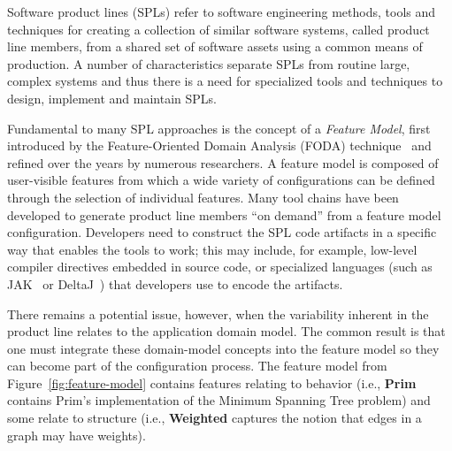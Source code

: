 
Software product lines (SPLs) refer to software engineering methods,
tools and techniques for creating a collection of similar software
systems, called product line members, from a shared set of software
assets using a common means of production. A number of characteristics
separate SPLs from routine large, complex systems and thus there is a need for specialized tools and techniques to design, implement and maintain SPLs. 

Fundamental to many SPL approaches is the concept of a \textit{Feature
Model}, first introduced by the Feature-Oriented Domain Analysis (FODA)
technique~\cite{Kang1990} and refined over the years by numerous
researchers. A feature model is composed of user-visible features from
which a wide variety of configurations can be defined through the
selection of individual features. Many tool chains have been developed
to generate product line members ``on demand'' from a feature model
configuration. Developers need to construct the SPL code artifacts in a
specific way that enables the tools to work; this may include, for
example, low-level compiler directives embedded in source code, or
specialized languages (such as JAK~\cite{Batory2004FeatureorientedPA} or
DeltaJ~\cite{Schaefer:2010:DPS:1885639.1885647}) that developers use to
encode the artifacts.


There remains a potential issue, however, when the variability inherent in the product line relates to the application domain model. The common result is that one must integrate these domain-model concepts into the feature model so they can become part of the configuration process. The feature model from Figure~\ref{fig:feature-model} contains features relating to behavior (i.e., \textbf{Prim} contains Prim's implementation of the Minimum Spanning Tree problem) and some relate to structure (i.e., \textbf{Weighted} captures the notion that edges in a graph may have weights). 

